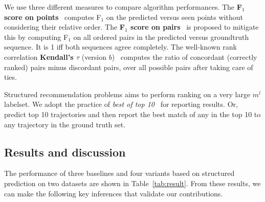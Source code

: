 We use three different measures to compare algorithm performances.
The {\bf F$_1$ score on points}~\cite{ijcai15} computes F$_1$ on the predicted versus seen points
without considering their relative order.
The {\bf F$_1$ score on pairs}~\cite{cikm16paper} is proposed to mitigate this by computing F$_1$ on all ordered pairs in the predicted versus groundtruth sequence. It is 1 iff both sequences agree completely.
The well-known rank correlation {\bf Kendall's $\tau$} (version $b$)~\cite{agresti2010analysis} 
computes the ratio of concordant (correctly ranked) pairs minus discordant pairs, over all possible pairs after taking care of ties.

Structured recommendation problems aims to perform ranking on a very large $m^l$ labelset.
We adopt the practice of {\em best of top 10}~\cite{russakovsky2015imagenet} for reporting results. Or, predict top 10 trajectories and then report the best match of any in the top 10 to any trajectory in the ground truth set.

\secmoveup
\subsection{Results and discussion}
\label{sec:result}
\textmoveup



The performance of three baselines and four variants based on structured prediction on two datasets are shown in Table~\ref{tab:result}.
From these results, we can make the following key inferences that validate our contributions.

